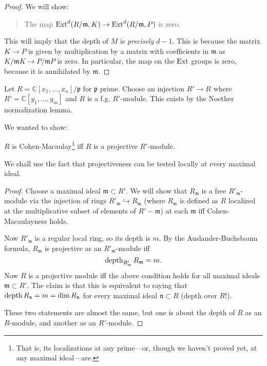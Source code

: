 \begin{proof}
We will show:
\begin{quote}
The map $\operatorname{Ext}^d(R/\mathfrak{m}, K) \to \operatorname{Ext}^{d}(R/\mathfrak{m},
P)$ is zero.
\end{quote}
This will imply that the depth of $M$ is \emph{precisely} $d-1$.
This is because the matrix $K \to P$ is given by multiplication
by a matrix
with coefficients in $\mathfrak{m}$ as $K/\mathfrak{m}K \to
P/\mathfrak{m}P$
is zero. In particular, the map on the $\operatorname{Ext}$ groups is zero,
because it is
annihilated by $\mathfrak{m}$.
\end{proof}

\begin{example}
Let $R = \mathbb{C}[x_1, \dots, x_n]/\mathfrak{p}$ for
$\mathfrak{p}$ prime.
Choose an injection $R' \to R$ where $R' = \mathbb{C}[y_1,
\dots, y_m]$ and
$R$ is a f.g. $R'$-module. This exists by the Noether
normalization lemma.

We wanted to show:

\begin{theorem}
$R$ is Cohen-Macaulay\footnote{That is, its localizations at any
prime---or,
though we haven't proved yet, at any maximal ideal---are.} iff
$R$ is a
projective $R'$-module.
\end{theorem}

We shall use the fact that projectiveness can be tested locally
at every
maximal ideal.

\begin{proof}
Choose a maximal ideal $\mathfrak{m} \subset R'$. We will show
that
$R_{\mathfrak{m}}$ is a free $R'_{\mathfrak{m}}$-module via the
injection of
rings $R'_{\mathfrak{m}} \hookrightarrow R_{\mathfrak{m}}$
(where
$R_{\mathfrak{m}}$ is defined as $R$ localized at the
multiplicative subset
of elements of $R' - \mathfrak{m}$) at each $\mathfrak{m}$ iff
Cohen-Macaulayness holds.

Now $R'_{\mathfrak{m}}$ is a regular local ring, so its depth is
$m$. By the
Auslander-Buchsbaum formula, $R_{\mathfrak{m}}$ is projective as
an
$R'_{\mathfrak{m}}$-module iff
\[ \operatorname{depth}_{R'_{\mathfrak{m}}} R_{\mathfrak{m}} = m.  \]
Now $R$ is a projective module iff the above condition holds for
all maximal
ideals $\mathfrak{m} \subset R'$. The claim is that this is
equivalent to
saying that $\operatorname{depth} R_{\mathfrak{n}} = m = \dim
R_{\mathfrak{n}}$
for every maximal ideal $\mathfrak{n} \subset R$ (depth over
$R$!).

These two statements are almost the same, but one is about the
depth of $R$ as
an $R$-module, and another as an $R'$-module.


\end{proof}
\end{example}
